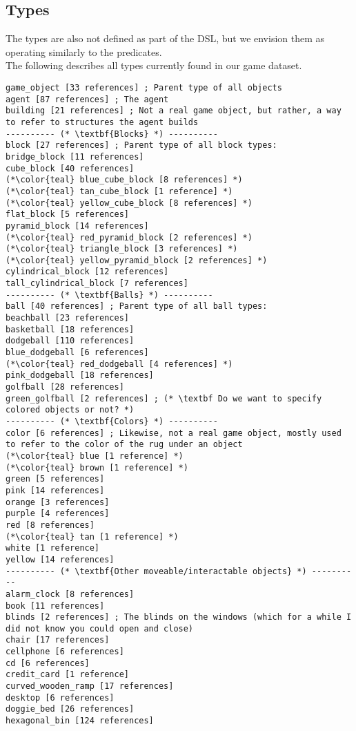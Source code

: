 \documentclass{article}
\begin{document}
\subsection{Types}
The types are also not defined as part of the DSL, but we envision them as operating similarly to the predicates. \\

            The following describes all types currently found in our game dataset.

\begin{lstlisting}
game_object [33 references] ; Parent type of all objects
agent [87 references] ; The agent
building [21 references] ; Not a real game object, but rather, a way to refer to structures the agent builds
---------- (* \textbf{Blocks} *) ----------
block [27 references] ; Parent type of all block types:
bridge_block [11 references]
cube_block [40 references]
(*\color{teal} blue_cube_block [8 references] *)
(*\color{teal} tan_cube_block [1 reference] *)
(*\color{teal} yellow_cube_block [8 references] *)
flat_block [5 references]
pyramid_block [14 references]
(*\color{teal} red_pyramid_block [2 references] *)
(*\color{teal} triangle_block [3 references] *)
(*\color{teal} yellow_pyramid_block [2 references] *)
cylindrical_block [12 references]
tall_cylindrical_block [7 references]
---------- (* \textbf{Balls} *) ----------
ball [40 references] ; Parent type of all ball types:
beachball [23 references]
basketball [18 references]
dodgeball [110 references]
blue_dodgeball [6 references]
(*\color{teal} red_dodgeball [4 references] *)
pink_dodgeball [18 references]
golfball [28 references]
green_golfball [2 references] ; (* \textbf Do we want to specify colored objects or not? *)
---------- (* \textbf{Colors} *) ----------
color [6 references] ; Likewise, not a real game object, mostly used to refer to the color of the rug under an object
(*\color{teal} blue [1 reference] *)
(*\color{teal} brown [1 reference] *)
green [5 references]
pink [14 references]
orange [3 references]
purple [4 references]
red [8 references]
(*\color{teal} tan [1 reference] *)
white [1 reference]
yellow [14 references]
---------- (* \textbf{Other moveable/interactable objects} *) ----------
alarm_clock [8 references]
book [11 references]
blinds [2 references] ; The blinds on the windows (which for a while I did not know you could open and close)
chair [17 references]
cellphone [6 references]
cd [6 references]
credit_card [1 reference]
curved_wooden_ramp [17 references]
desktop [6 references]
doggie_bed [26 references]
hexagonal_bin [124 references]

\end{lstlisting}
\end{document}
